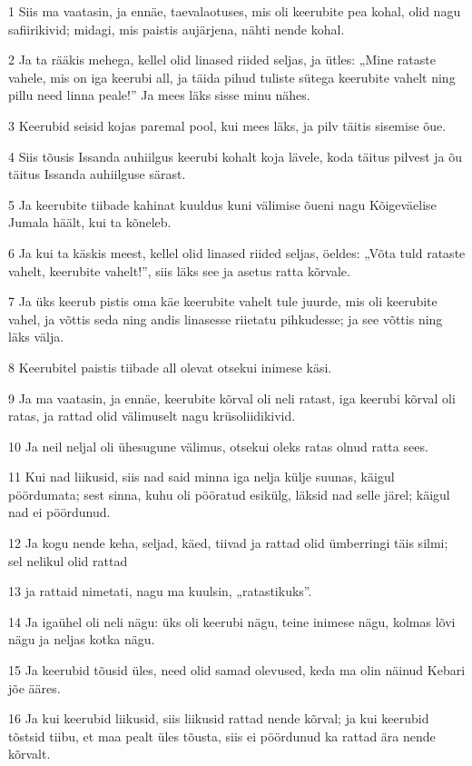 \par 1 Siis ma vaatasin, ja ennäe, taevalaotuses, mis oli keerubite pea kohal, olid nagu safiirikivid; midagi, mis paistis aujärjena, nähti nende kohal.
\par 2 Ja ta rääkis mehega, kellel olid linased riided seljas, ja ütles: „Mine rataste vahele, mis on iga keerubi all, ja täida pihud tuliste sütega keerubite vahelt ning pillu need linna peale!” Ja mees läks sisse minu nähes.
\par 3 Keerubid seisid kojas paremal pool, kui mees läks, ja pilv täitis sisemise õue.
\par 4 Siis tõusis Issanda auhiilgus keerubi kohalt koja lävele, koda täitus pilvest ja õu täitus Issanda auhiilguse särast.
\par 5 Ja keerubite tiibade kahinat kuuldus kuni välimise õueni nagu Kõigeväelise Jumala häält, kui ta kõneleb.
\par 6 Ja kui ta käskis meest, kellel olid linased riided seljas, öeldes: „Võta tuld rataste vahelt, keerubite vahelt!”, siis läks see ja asetus ratta kõrvale.
\par 7 Ja üks keerub pistis oma käe keerubite vahelt tule juurde, mis oli keerubite vahel, ja võttis seda ning andis linasesse riietatu pihkudesse; ja see võttis ning läks välja.
\par 8 Keerubitel paistis tiibade all olevat otsekui inimese käsi.
\par 9 Ja ma vaatasin, ja ennäe, keerubite kõrval oli neli ratast, iga keerubi kõrval oli ratas, ja rattad olid välimuselt nagu krüsoliidikivid.
\par 10 Ja neil neljal oli ühesugune välimus, otsekui oleks ratas olnud ratta sees.
\par 11 Kui nad liikusid, siis nad said minna iga nelja külje suunas, käigul pöördumata; sest sinna, kuhu oli pööratud esikülg, läksid nad selle järel; käigul nad ei pöördunud.
\par 12 Ja kogu nende keha, seljad, käed, tiivad ja rattad olid ümberringi täis silmi; sel nelikul olid rattad
\par 13 ja rattaid nimetati, nagu ma kuulsin, „ratastikuks”.
\par 14 Ja igaühel oli neli nägu: üks oli keerubi nägu, teine inimese nägu, kolmas lõvi nägu ja neljas kotka nägu.
\par 15 Ja keerubid tõusid üles, need olid samad olevused, keda ma olin näinud Kebari jõe ääres.
\par 16 Ja kui keerubid liikusid, siis liikusid rattad nende kõrval; ja kui keerubid tõstsid tiibu, et maa pealt üles tõusta, siis ei pöördunud ka rattad ära nende kõrvalt.
